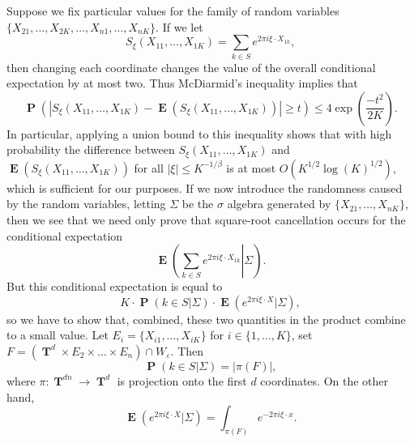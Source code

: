 \documentclass[openany,nobib,nols,a4paper,twoside,symmetric,justified,notoc]{tufte-book}
\theoremstyle{plain}
\theoremstyle{remark}
\theoremstyle{definition}
\DeclareMathOperator{\TT}{\mathbf{T}}
\DeclareMathOperator{\EE}{\mathbf{E}}
\DeclareMathOperator{\PP}{\mathbf{P}}
\begin{document}
Suppose we fix particular values for the family of random variables $\{ X_{21}, \dots, X_{2K}, \dots, X_{n1}, \dots, X_{nK} \}$. If we let
%
\[ S_\xi(X_{11}, \dots, X_{1K}) = \sum_{k \in S} e^{2 \pi i \xi \cdot X_{1k}}, \]
%
then changing each coordinate changes the value of the overall conditional expectation by at most two. Thus McDiarmid's inequality implies that
%
\[ \PP \left( |S_\xi(X_{11}, \dots, X_{1K}) - \EE(S_\xi(X_{11}, \dots, X_{1K}))| \geq t \right) \leq 4 \exp \left( \frac{-t^2}{2K} \right). \]
%
In particular, applying a union bound to this inequality shows that with high probability the difference between $S_\xi(X_{11}, \dots, X_{1K})$ and $\EE(S_\xi(X_{11}, \dots, X_{1K}))$ for all $|\xi| \leq K^{-1/\beta}$ is at most $O(K^{1/2} \log(K)^{1/2})$, which is sufficient for our purposes. If we now introduce the randomness caused by the random variables, letting $\Sigma$ be the $\sigma$ algebra generated by $\{ X_{21}, \dots, X_{nK} \}$, then we see that we need only prove that square-root cancellation occurs for the conditional expectation
%
\[ \EE \left. \left( \sum_{k \in S} e^{2 \pi i \xi \cdot X_{1k}} \right| \Sigma \right). \]
%
But this conditional expectation is equal to
%
\[ K \cdot \PP \left( k \in S | \Sigma \right) \cdot \EE \left( e^{2 \pi i \xi \cdot X} | \Sigma \right), \]
%
so we have to show that, combined, these two quantities in the product combine to a small value. Let $E_i = \{ X_{i1}, \dots, X_{iK} \}$ for $i \in \{ 1, \dots, K \}$, set $F = (\TT^d \times E_2 \times \dots \times E_n) \cap W_\varepsilon$. Then
%
\[ \PP \left( k \in S | \Sigma \right) = |\pi(F)|, \]
%
where $\pi: \TT^{dn} \to \TT^d$ is projection onto the first $d$ coordinates. On the other hand,
%
\[ \EE \left( e^{2 \pi i \xi \cdot X} | \Sigma \right) = \int_{\pi(F)} e^{-2 \pi i \xi \cdot x}. \]









\end{document}
